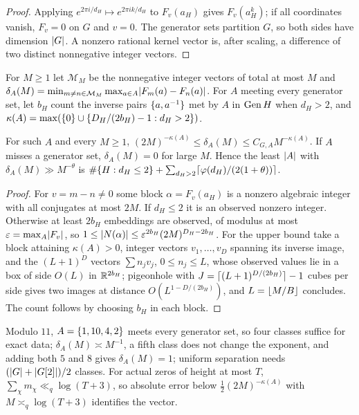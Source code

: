 \begin{proof}
Applying $e^{2\pi i/d_H}\mapsto e^{2\pi ik/d_H}$ to $F_v(a_H)$ gives $F_v(a_H^k)$; if all coordinates
vanish, $F_v=0$ on $G$ and $v=0$. The generator sets partition $G$, so both sides have dimension
$\lvert G\rvert$. A nonzero rational kernel vector is, after scaling, a difference of two distinct
nonnegative integer vectors.
\end{proof}

For $M\ge1$ let $\mathcal M_M$ be the nonnegative integer vectors of total at most $M$ and
$\delta_A(M)=\min_{m\ne n\in\mathcal M_M}\max_{a\in A}\lvert F_m(a)-F_n(a)\rvert$. For $A$ meeting every generator set,
let $b_H$ count the inverse pairs $\{a,a^{-1}\}$ met by $A$ in $\operatorname{Gen} H$ when $d_H>2$, and
$\kappa(A)=\max(\{0\}\cup\{D_H/(2b_H)-1:d_H>2\})$.

\begin{theorem}\label{rec:thm:precision}
For such $A$ and every $M\ge1$, $(2M)^{-\kappa(A)}\le\delta_A(M)\le C_{G,A}M^{-\kappa(A)}$. If $A$ misses a
generator set, $\delta_A(M)=0$ for large $M$. Hence the least $\lvert A\rvert$ with $\delta_A(M)\gg M^{-\theta}$
is $\#\{H:d_H\le2\}+\sum_{d_H>2}\lceil\varphi(d_H)/(2(1+\theta))\rceil$.
\end{theorem}

\begin{proof}
For $v=m-n\ne0$ some block $\alpha=F_v(a_H)$ is a nonzero algebraic integer with all conjugates at
most $2M$. If $d_H\le2$ it is an observed nonzero integer. Otherwise at least $2b_H$ embeddings are
observed, of modulus at most $\varepsilon=\max_A\lvert F_v\rvert$, so
$1\le\lvert N(\alpha)\rvert\le\varepsilon^{2b_H}(2M)^{D_H-2b_H}$. For the upper bound take a block attaining
$\kappa(A)>0$, integer vectors $v_1,\dots,v_D$ spanning its inverse image, and the $(L+1)^D$ vectors
$\sum n_jv_j$, $0\le n_j\le L$, whose observed values lie in a box of side $O(L)$ in $\mathbb{R}^{2b_H}$;
pigeonhole with $J=\lceil(L+1)^{D/(2b_H)}\rceil-1$ cubes per side gives two images at distance
$O(L^{1-D/(2b_H)})$, and $L=\lfloor M/B\rfloor$ concludes. The count follows by choosing $b_H$ in each block.
\end{proof}

Modulo $11$, $A=\{1,10,4,2\}$ meets every generator set, so four classes suffice for exact data;
$\delta_A(M)\asymp M^{-1}$, a fifth class does not change the exponent, and adding both $5$ and $8$
gives $\delta_A(M)=1$; uniform separation needs $(\lvert G\rvert+\lvert G[2]\rvert)/2$ classes. For actual zeros of
height at most $T$, $\sum_\chi m_\chi\ll_q\log(T+3)$, so absolute error below
$\tfrac12(2M)^{-\kappa(A)}$ with $M\asymp_q\log(T+3)$ identifies the vector.

